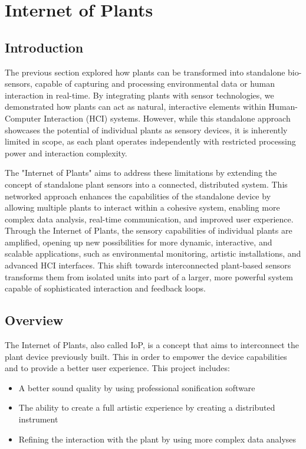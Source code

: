 \section{Internet of Plants}

\subsection{Introduction}

The previous section explored how plants can be transformed into standalone bio-sensors, capable of capturing and processing environmental data or human interaction in real-time. By integrating plants with sensor technologies, we demonstrated how plants can act as natural, interactive elements within Human-Computer Interaction (HCI) systems. However, while this standalone approach showcases the potential of individual plants as sensory devices, it is inherently limited in scope, as each plant operates independently with restricted processing power and interaction complexity.

The "Internet of Plants" aims to address these limitations by extending the concept of standalone plant sensors into a connected, distributed system. This networked approach enhances the capabilities of the standalone device by allowing multiple plants to interact within a cohesive system, enabling more complex data analysis, real-time communication, and improved user experience. Through the Internet of Plants, the sensory capabilities of individual plants are amplified, opening up new possibilities for more dynamic, interactive, and scalable applications, such as environmental monitoring, artistic installations, and advanced HCI interfaces. This shift towards interconnected plant-based sensors transforms them from isolated units into part of a larger, more powerful system capable of sophisticated interaction and feedback loops.


\subsection{Overview}

The Internet of Plants, also called IoP, is a concept that aims to interconnect the plant device previously built.
This in order to empower the device capabilities and to provide a better user experience.
This project includes:
\begin{itemize}
    \item A better sound quality by using professional sonification software
    \item The ability to create a full artistic experience by creating a distributed instrument
    \item Refining the interaction with the plant by using more complex data analyses
\end{itemize}



